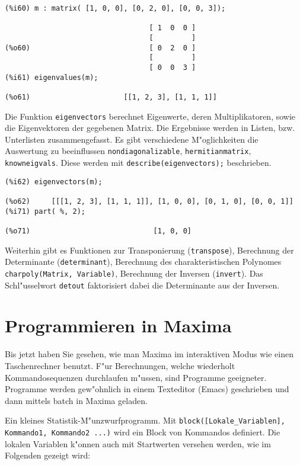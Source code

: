 \documentclass[ngerman,12pt,a4paper]{article}
\begin{document}
\scriptsize
\begin{verbatim}
(%i60) m : matrix( [1, 0, 0], [0, 2, 0], [0, 0, 3]);

                                  [ 1  0  0 ]
                                  [         ]
(%o60)                            [ 0  2  0 ]
                                  [         ]
                                  [ 0  0  3 ]
(%i61) eigenvalues(m);

(%o61)                      [[1, 2, 3], [1, 1, 1]]
\end{verbatim}
\normalsize

Die Funktion \verb|eigenvectors| berechnet Eigenwerte, deren Multiplikatoren, sowie die Eigenvektoren der gegebenen Matrix. Die Ergebnisse werden in Listen, bzw. Unterlisten zusammengefasst. Es gibt verschiedene M"oglichkeiten die Auswertung zu beeinflussen \verb|nondiagonalizable|, \verb|hermitianmatrix|, \verb|knowneigvals|. Diese werden mit \verb|describe(eigenvectors);| beschrieben.

\scriptsize
\begin{verbatim}
(%i62) eigenvectors(m);

(%o62)     [[[1, 2, 3], [1, 1, 1]], [1, 0, 0], [0, 1, 0], [0, 0, 1]]
(%i71) part( %, 2);

(%o71)                             [1, 0, 0]
\end{verbatim}
\normalsize

Weiterhin gibt es Funktionen zur Transponierung (\verb|transpose|),
Berechnung der Determinante (\verb|determinant|), Berechnung  des
charakteristischen  Polynomes \verb|charpoly(Matrix, Variable)|,
Berechnung der Inversen (\verb|invert|). Das  Schl"usselwort
\verb|detout| faktorisiert  dabei die Determinante aus der Inversen.


\section{Programmieren in Maxima}

Bis jetzt haben Sie gesehen, wie man Maxima im interaktiven Modus wie
einen Taschenrechner benutzt. F"ur Berechnungen, welche wiederholt
Kommandosequenzen durchlaufen m"ussen, sind Programme geeigneter.
Programme werden gew"ohnlich in einem Texteditor (Emacs) geschrieben
und dann mittels batch in Maxima geladen.

Ein kleines Statistik-M"unzwurfprogramm.
Mit \verb|block([Lokale_Variablen], Kommando1, Kommando2 ...)| wird
ein Block von Kommandos  definiert. Die lokalen Variablen k"onnen auch
mit Startwerten versehen werden, wie im Folgenden gezeigt wird:
\end{document}
